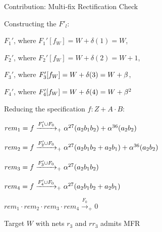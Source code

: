 \begin{frame}{\large Contribution: Multi-fix Rectification Check}
\bi
	\item Constructing the $F'_l$:
	\bi
		\item {$F_1'$, where $F_1'[f_W]=W+\delta(1)=W$},
		\item {$F_2'$, where $F_2'[f_W]=W+\delta(2)=W+1$},
		\item {$F_3'$, where $F_3'[f_W]=W+\delta(3)=W+\beta$},
		\item {$F_4'$, where $F_4'[f_W]=W+\delta(4)=W+\beta^2$}
	\ei
	\vspace{0.1in}
	\pause
	\item Reducing the specification $f: Z+A\cdot B$:
\bi
\item $rem_1 = f \xrightarrow[]{F_1'\cup F_{0}}_+{\alpha^{27} (a_2b_1b_2)+\alpha^{36} (a_2b_2)}$
\item $rem_2 = f \xrightarrow[]{F_2'\cup F_{0}}_+{\alpha^{27} (a_2b_1b_2+a_2b_1)+\alpha^{36} (a_2b_2)}$
\item $rem_3 = f \xrightarrow[]{F_3'\cup F_{0}}_+{\alpha^{27} (a_2b_1b_2)}$
\item $rem_4 = f \xrightarrow[]{F_4'\cup F_{0}}_+{\alpha^{27} (a_2b_1b_2+a_2b_1)}$
\ei \pause
	\item $rem_1\cdot rem_2 \cdot rem_3 \cdot rem_4 \xrightarrow{F_0}_+0$
	\item Target $W$ with nets $r_3$ and $rr_3$ admits MFR
\ei
\end{frame}






